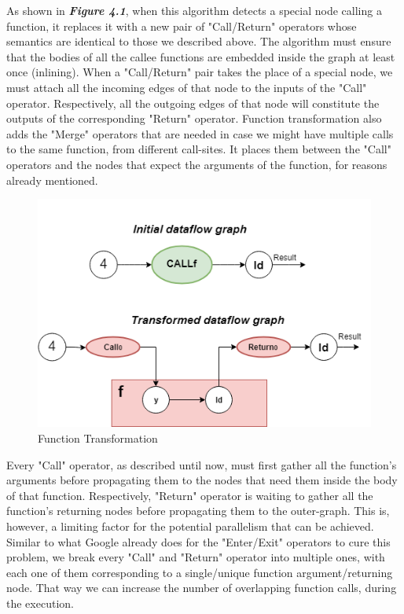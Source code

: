 \documentclass[ack,preface]{dithesis}
\begin{document}
As shown in \textit{\textbf{Figure 4.1}}, when this algorithm detects a special node calling a function, it replaces it with a new pair of "Call/Return" operators whose semantics are identical to those we described above. The algorithm must ensure that the bodies of all the callee functions are embedded inside the graph at least once (inlining).
When a "Call/Return" pair takes the place of a special node, we must attach all the incoming edges of that node to the inputs of the "Call" operator. Respectively, all the outgoing edges of that node will constitute the outputs of the corresponding "Return" operator. Function transformation also adds the "Merge" operators that are needed in case we might have multiple calls to the same function, from different call-sites. It places them between the "Call" operators and the nodes that expect the arguments of the function, for reasons already mentioned.

\begin{figure}
\centering
\includegraphics[scale=0.65]{figures/transformation}
\caption{Function Transformation}
\end{figure}

Every "Call" operator, as described until now, must first gather all the function's arguments before propagating them to the nodes that need them inside the body of that function. Respectively, "Return" operator is waiting to gather all the function's returning nodes before propagating them to the outer-graph. This is, however, a limiting factor for the potential parallelism that can be achieved. Similar to what Google already does for the "Enter/Exit" operators to cure this problem, we break every "Call" and "Return" operator into multiple ones, with each one of them corresponding to a single/unique function argument/returning node. That way we can increase the number of overlapping function calls, during the execution.
\end{document}
